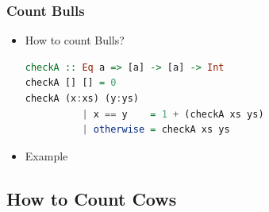 \documentclass[10pt]{beamer}
\begin{document}

\begin{frame}[fragile]
\frametitle{Count Bulls}
\begin{itemize}%
    \item How to count Bulls?\\
     \begin{lstlisting}[language=Haskell]
checkA :: Eq a => [a] -> [a] -> Int
checkA [] [] = 0
checkA (x:xs) (y:ys)
          | x == y    = 1 + (checkA xs ys)
          | otherwise = checkA xs ys
    \end{lstlisting}
    
    \item Example\\ 
    
\end{itemize}
    
\end{frame}






\subsection{How to Count Cows}
\end{document}
